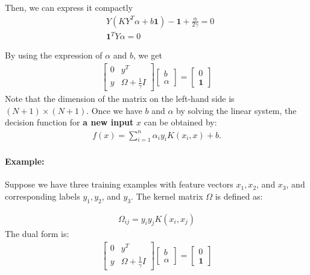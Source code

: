 Then, we can express it compactly
\begin{align*}
	&Y(KY^T\alpha+b\mathbf{1})-\mathbf{1}+\frac{\alpha}{2\gamma} = 0\\
	&\mathbf{1}^TY\alpha = 0
\end{align*}

By using the expression of $\alpha$ and $b$, we get
\begin{align*}
	\begin{bmatrix}
		0 & y^T \\
		y & \Omega + \frac{1}{\gamma} I
	\end{bmatrix}
	\begin{bmatrix}
		b \\
		\alpha
	\end{bmatrix}
	=
	\begin{bmatrix}
		0 \\
	\mathbf{1}
	\end{bmatrix}
\end{align*}
Note that the dimension of the matrix on the left-hand side is $(N+1)\times (N+1)$. Once we have $b$ and $\alpha$ by solving the linear system, the decision function for \textbf{a new input} $x$ can be obtained by:
\begin{align*}
	f(x) = \sum_{i=1}^n \alpha_i y_i K(x_i, x) + b.
\end{align*}
\paragraph{Example: }Suppose we have three training examples with feature vectors $x_1, x_2$, and $x_3$, and corresponding labels $y_1, y_2$, and $y_3$. The kernel matrix $\Omega$ is defined as:

\begin{align*}
	\Omega_{ij} = y_i y_j K(x_i, x_j)
\end{align*}
The dual form is:
\begin{align*}
	\begin{bmatrix}
	0 & y^T \\
	y & \Omega + \frac{1}{\gamma} I
	\end{bmatrix}
	\begin{bmatrix}
	b \\
	\alpha
	\end{bmatrix}
	=
	\begin{bmatrix}
	0 \\
	\mathbf{1}	
	\end{bmatrix}
\end{align*}

